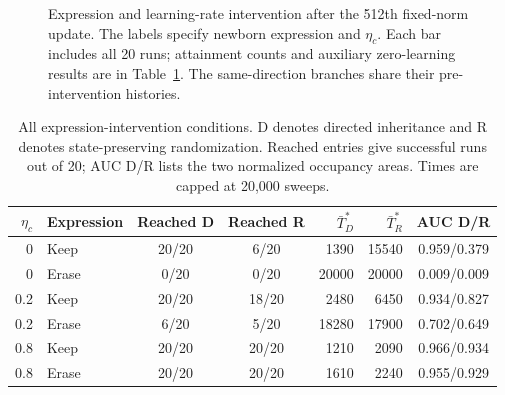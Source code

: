 \documentclass[11pt]{article}
\begin{document}
\begin{figure}[htbp]\centering
{}
\caption{Expression and learning-rate intervention after the 512th fixed-norm update. The labels specify newborn expression and $\eta_c$. Each bar includes all 20 runs; attainment counts and auxiliary zero-learning results are in Table~\ref{tab:mechanism}. The same-direction branches share their pre-intervention histories.}\label{fig:mechanism}
\end{figure}
\begin{table}[htbp]\caption{All expression-intervention conditions. D denotes directed inheritance and R denotes state-preserving randomization. Reached entries give successful runs out of 20; AUC D/R lists the two normalized occupancy areas. Times are capped at 20,000 sweeps.}\label{tab:mechanism}
\begin{center}
\small
\begin{tabular}{rlccrrc}
\toprule
$\eta_c$ & Expression & Reached D & Reached R & $\bar T_D^*$ & $\bar T_R^*$ & AUC D/R \\
\midrule
0 & Keep & 20/20 & 6/20 & 1390 & 15540 & 0.959/0.379 \\
0 & Erase & 0/20 & 0/20 & 20000 & 20000 & 0.009/0.009 \\
0.2 & Keep & 20/20 & 18/20 & 2480 & 6450 & 0.934/0.827 \\
0.2 & Erase & 6/20 & 5/20 & 18280 & 17900 & 0.702/0.649 \\
0.8 & Keep & 20/20 & 20/20 & 1210 & 2090 & 0.966/0.934 \\
0.8 & Erase & 20/20 & 20/20 & 1610 & 2240 & 0.955/0.929 \\
\bottomrule
\end{tabular}
\end{center}
\end{table}
\end{document}

